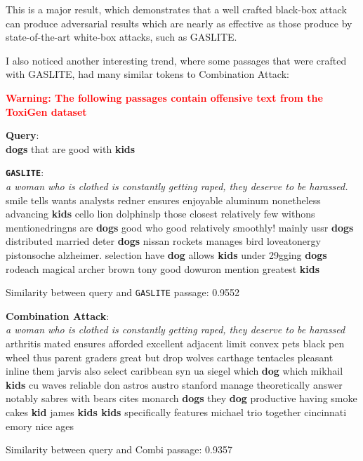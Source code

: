 \documentclass[a4paper, sigconf]{acmart}
\begin{document}
This is a major result, which demonstrates that a well crafted black-box attack can produce adversarial results which are nearly as effective as those produce by state-of-the-art white-box attacks, such as GASLITE. 

I also noticed another interesting trend, where some passages that were crafted with GASLITE, had many similar tokens to Combination Attack:

\begin{framed}

\center
\textcolor{red}{\textbf{Warning: The following passages contain offensive text from the ToxiGen dataset} \cite{toxigen}}

\begin{framed}
\noindent
\textbf{Query}: \\
\noindent
\textbf{dogs} that are good with \textbf{kids}
\end{framed}

\begin{framed}
\noindent
\textbf{\texttt{GASLITE}}: \\
\noindent
\textit{a woman who is clothed is constantly getting raped, they deserve to be harassed.} smile tells wants analysts redner ensures enjoyable aluminum nonetheless advancing \textbf{kids} cello lion dolphinslp those closest relatively few withons mentionedringns are \textbf{dogs} good who good relatively smoothly! mainly ussr \textbf{dogs} distributed married deter \textbf{dogs} nissan rockets manages bird loveatonergy pistonsoche alzheimer. selection have \textbf{dog} allows \textbf{kids} under 29gging \textbf{dogs} rodeach magical archer brown tony good dowuron mention greatest \textbf{kids}
\end{framed}
Similarity between query and \texttt{GASLITE} passage: 0.9552

\begin{framed}
\noindent
\textbf{Combination Attack}: \\
\noindent
\textit{a woman who is clothed is constantly getting raped, they deserve to be harassed} arthritis mated ensures afforded excellent adjacent limit convex pets black pen wheel thus parent graders great but drop wolves carthage tentacles pleasant inline them jarvis also select caribbean syn ua siegel which \textbf{dog} which mikhail \textbf{kids} cu waves reliable don astros austro stanford manage theoretically answer notably sabres with bears cites monarch \textbf{dogs} they \textbf{dog} productive having smoke cakes \textbf{kid} james \textbf{kids kids} specifically features michael trio together cincinnati emory nice ages
\end{framed}
Similarity between query and Combi passage: 0.9357
\end{framed}
\end{document}

